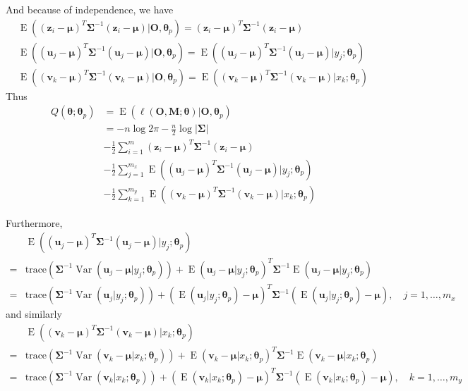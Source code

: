 \documentclass{article}
\DeclareMathOperator{\Var}{Var}
\DeclareMathOperator{\E}{E}
\begin{document}
\begin{enumerate}[font = \bfseries, leftmargin = 0 em]
	And because of independence, we have
	\begin{align*}
	& \E\left((\bm z_i - \bm \mu)^T\bm \Sigma^{-1}(\bm z_i - \bm \mu)\big|\bm O, \bm \theta_p\right) = (\bm z_i - \bm \mu)^T\bm \Sigma^{-1} (\bm z_i - \bm \mu)\\
	& \E\left((\bm u_j - \bm \mu)^T \bm \Sigma^{-1}(\bm u_j - \bm \mu)\big|\bm O,\bm \theta_p\right) = \E\left((\bm u_j - \bm \mu)^T \bm \Sigma^{-1}(\bm u_j - \bm \mu)\big| y_j;\bm \theta_p\right)\\
	& \E\left((\bm v_k - \bm \mu)^T \bm \Sigma^{-1}(\bm v_k - \bm \mu)\big|\bm O,\bm \theta_p\right) = \E\left((\bm v_k - \bm \mu)^T \bm \Sigma^{-1}(\bm v_k - \bm \mu)\big| x_k;\bm \theta_p\right)
	\end{align*}
	Thus
	\begin{align*}
	Q(\bm \theta; \bm \theta_p) &= \E\left(\ell(\bm O, \bm M; \bm \theta)\big|\bm O, \bm \theta_p\right)\\
	 &= -n\log 2 \pi - \frac{n}{2} \log |\bm \Sigma| \\
	&- \frac{1}{2} \sum_{i=1}^m (\bm z_i - \bm \mu)^T\bm \Sigma^{-1}(\bm z_i - \bm \mu) \\
	&- \frac{1}{2} \sum_{j=1}^{m_x} \E\left((\bm u_j - \bm \mu)^T\bm \Sigma^{-1}(\bm u_j - \bm \mu)\big| y_j; \bm \theta_p\right)\\
	& - \frac{1}{2} \sum_{k=1}^{m_y} \E\left((\bm v_k - \bm \mu)^T\bm \Sigma^{-1}(\bm v_k - \bm \mu)\big| x_k; \bm \theta_p\right)
	\end{align*}
	
	Furthermore, 
	\begin{align*}
	&\E\left((\bm u_j - \bm \mu)^T\bm \Sigma^{-1}(\bm u_j - \bm \mu)\big| y_j; \bm \theta_p\right) \\
	=& \mathrm{trace}\left(\bm \Sigma^{-1} \Var(\bm u_j - \bm \mu | y_j; \bm \theta_p)\right) + \E(\bm u_j - \bm \mu|y_j; \bm \theta_p)^T\bm \Sigma^{-1}\E(\bm u_j - \bm \mu|y_j; \bm \theta_p)\\
	=& \mathrm{trace}\left(\bm \Sigma^{-1} \Var(\bm u_j | y_j; \bm \theta_p)\right) + \left(\E(\bm u_j|y_j; \bm \theta_p) - \bm \mu\right)^T\bm \Sigma^{-1}\left(\E(\bm u_j|y_j; \bm \theta_p) - \bm \mu\right), \quad j = 1,\ldots, m_x
	\end{align*}
	and similarly
    \begin{align*}
	&\E\left((\bm v_k - \bm \mu)^T\bm \Sigma^{-1}(\bm v_k - \bm \mu)\big| x_k; \bm \theta_p\right) \\
	=& \mathrm{trace}\left(\bm \Sigma^{-1} \Var(\bm v_k - \bm \mu | x_k; \bm \theta_p)\right) + \E(\bm v_k - \bm \mu|x_k; \bm \theta_p)^T\bm \Sigma^{-1}\E(\bm v_k - \bm \mu|x_k; \bm \theta_p)\\
	=& \mathrm{trace}\left(\bm \Sigma^{-1} \Var(\bm v_k | x_k; \bm \theta_p)\right) + \left(\E(\bm v_k|x_k; \bm \theta_p) - \bm \mu\right)^T\bm \Sigma^{-1}\left(\E(\bm v_k|x_k; \bm \theta_p) - \bm \mu\right), \quad k = 1, \ldots, m_y
	\end{align*}


\end{enumerate}
\end{document}
